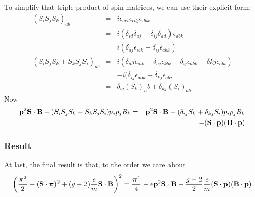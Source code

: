 To simplify that triple product of spin matrices, we can use their explicit form:
\begin{eqnarray*}
	(S_i S_j S_k )_{ab}
		&=&	i\epsilon_{aci}\epsilon_{cdj}\epsilon_{dbk}	\\
		&=&	i(\delta_{id} \delta_{aj} - \delta_{ij} \delta_{ad})\epsilon_{dbk}	\\
		&=&	i(\delta_{aj} \epsilon_{ibk} - \delta_{ij} \epsilon_{abk})		\\
	(S_i S_j S_k + S_k S_j S_i)_{ab}
		&=& i(\delta_aj \epsilon_{ibk} + \delta_{aj} \epsilon_{kbi} -\delta_{ij} \epsilon_{abk} -\delta{kj}\epsilon_{abi})	\\
		&=& -i(\delta_{ij} \epsilon_{abk} + \delta_{kj} \epsilon_{abi}	\\
		&=&	\delta_{ij} {(S_k)}_ab + \delta_{kj} {(S_i)}_{ab}	
\end{eqnarray*}
Now 
\begin{eqnarray*}
 \mathbf{p}^2 \mathbf{S} \cdot \mathbf{B} - (S_i S_j S_k + S_k S_j S_i) p_i p_j B_k
 	&=& \mathbf{p}^2 \mathbf{S} \cdot \mathbf{B} - (\delta_{ij} S_k + \delta_{kj} S_i	) p_i p_j B_k	\\
 	&=& - (\mathbf{S} \cdot \mathbf{p}) (\mathbf{B} \cdot \mathbf{p})
\end{eqnarray*}
\subsubsection*{Result}
At last, the final result is that, to the order we care about 
\[
\left(  \frac {\mbox{\boldmath$ \pi $}^2} {2} -  (\mathbf{S} \cdot \mbox{\boldmath$ \pi $})^2 + (g-2)\frac{e}{m} \mathbf{S} \cdot \mathbf{B} \right )^2 
	=	\frac{ \mbox{\boldmath$ \pi $}^4 } {4}  -  e \mathbf{p}^2  \mathbf{S} \cdot \mathbf{B} \\
		 -\frac{g-2}{2}\frac{e}{m} (\mathbf{S} \cdot \mathbf{p}) (\mathbf{B} \cdot \mathbf{p})
\]	

